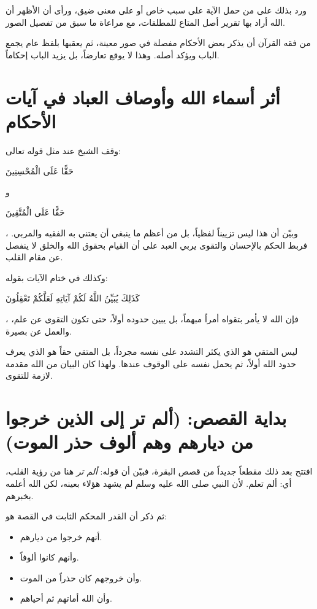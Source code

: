 ورد  بذلك على من حمل الآية على سبب خاص أو على معنى ضيق، ورأى أن الأظهر أن الله أراد بها تقرير أصل المتاع للمطلقات، مع مراعاة ما سبق من تفصيل الصور.

\begin{fawaid}
من فقه القرآن أن يذكر بعض الأحكام مفصلة في صور معينة، ثم يعقبها بلفظ عام يجمع الباب ويؤكد أصله. وهذا لا يوقع تعارضاً، بل يزيد الباب إحكاماً.
\end{fawaid}

\section{أثر أسماء الله وأوصاف العباد في آيات الأحكام}
وقف الشيخ عند مثل قوله تعالى: \begin{ayah}حَقًّا عَلَى الْمُحْسِنِينَ\end{ayah} و\begin{ayah}حَقًّا عَلَى الْمُتَّقِينَ\end{ayah}، وبيّن أن هذا ليس تزييناً لفظياً، بل من أعظم ما ينبغي أن يعتني به الفقيه والمربي. فربط الحكم بالإحسان والتقوى يربي العبد على أن القيام بحقوق الله والخلق لا ينفصل عن مقام القلب.

وكذلك في ختام الآيات بقوله: \begin{ayah}كَذَلِكَ يُبَيِّنُ اللَّهُ لَكُمْ آيَاتِهِ لَعَلَّكُمْ تَعْقِلُونَ\end{ayah}، فإن الله لا يأمر بتقواه أمراً مبهماً، بل يبين حدوده أولاً، حتى تكون التقوى عن علم، والعمل عن بصيرة.

\begin{fawaid}
ليس المتقي هو الذي يكثر التشدد على نفسه مجرداً، بل المتقي حقاً هو الذي يعرف حدود الله أولاً، ثم يحمل نفسه على الوقوف عندها. ولهذا كان البيان من الله مقدمة لازمة للتقوى.
\end{fawaid}

\separator

\section{بداية القصص: (ألم تر إلى الذين خرجوا من ديارهم وهم ألوف حذر الموت)}
افتتح  بعد ذلك مقطعاً جديداً من قصص البقرة، فبيّن أن قوله: \textit{ألم تر} هنا من رؤية القلب، أي: ألم تعلم. لأن النبي صلى الله عليه وسلم لم يشهد هؤلاء بعينه، لكن الله أعلمه بخبرهم.

ثم ذكر أن القدر المحكم الثابت في القصة هو:
\begin{itemize}
    \item أنهم خرجوا من ديارهم.
    \item وأنهم كانوا ألوفاً.
    \item وأن خروجهم كان حذراً من الموت.
    \item وأن الله أماتهم ثم أحياهم.
\end{itemize}

